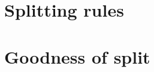 


\section{Splitting rules}
\label{sec:3:splitting-rules}


\section{Goodness of split}
\label{sec:3:criteria}


